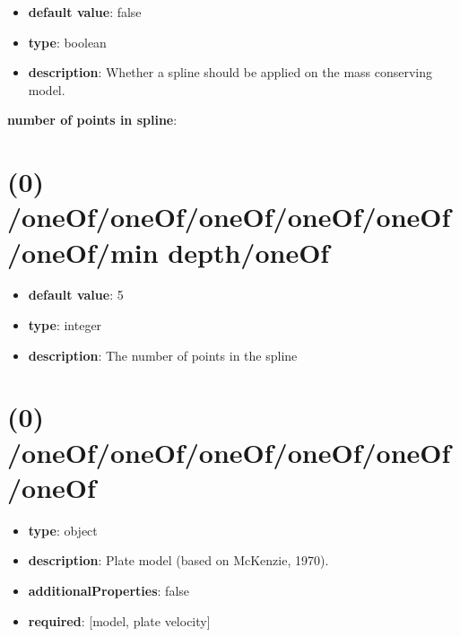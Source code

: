 \begin{itemize}[leftmargin=0em]\item {\bf default value}: false
\item {\bf type}: boolean
\item {\bf description}: Whether a spline should be applied on the mass conserving model.
\end{itemize}\item {\bf number of points in spline}: \section{(0) /oneOf/oneOf/oneOf/oneOf/oneOf/oneOf/min depth/oneOf}
\begin{itemize}[leftmargin=0em]\item {\bf default value}: 5
\item {\bf type}: integer
\item {\bf description}: The number of points in the spline
\end{itemize}\section{(0) /oneOf/oneOf/oneOf/oneOf/oneOf/oneOf}
\begin{itemize}[leftmargin=0em]\item {\bf type}: object
\item {\bf description}: Plate model (based on McKenzie, 1970).
\item {\bf additionalProperties}: false
\item {\bf required}: [model, plate velocity]\end{itemize}
